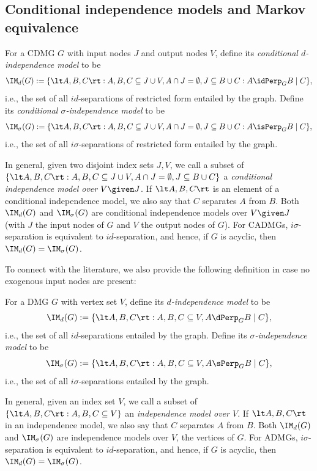 \subsection{Conditional independence models and Markov equivalence}

\begin{Def}\label{def:independence_model}
  For a CDMG $G$ with input nodes $J$ and output nodes $V$, define its \emph{conditional $d$-independence model} to be
  $$\IM_d(G) := \{ \lt A, B, C \rt : A, B, C \subseteq J \cup V, A \cap J = \emptyset, J \subseteq B \cup C : A \idPerp_G B \mid C \},$$
  i.e., the set of all $id$-separations of restricted form entailed by the graph. Define its
  \emph{conditional $\sigma$-independence model} to be
  $$\IM_\sigma(G) := \{ \lt A, B, C \rt : A, B, C \subseteq J \cup V, A \cap J = \emptyset, J \subseteq B \cup C : A \isPerp_G B \mid C \},$$
  i.e., the set of all $i\sigma$-separations of restricted form entailed by the graph. 
\end{Def}
In general, given two disjoint index sets $J,V$, we call a subset of 
$\{ \lt A, B, C \rt : A, B, C \subseteq J \cup V, A \cap J = \emptyset, J \subseteq B \cup C  \}$
a \emph{conditional independence model over $V \given J$}.
If $\lt A, B, C \rt$ is an element of a conditional independence model, we also say that $C$ separates $A$ from $B$.
Both $\IM_d(G)$ and $\IM_\sigma(G)$ are conditional independence models over $V \given J$ (with
$J$ the input nodes of $G$ and $V$ the output nodes of $G$).
For CADMGs, $i\sigma$-separation is equivalent to $id$-separation, and hence, if $G$ is acyclic, then
$\IM_d(G) = \IM_\sigma(G)$.

To connect with the literature, we also provide the following definition in case no exogenous input nodes are present:
\begin{Def}\label{def:independence_model}
  For a DMG $G$ with vertex set $V$, define its \emph{$d$-independence model} to be
  $$\IM_d(G) := \{ \lt A, B, C \rt : A, B, C \subseteq V, A \dPerp_G B \mid C \},$$
  i.e., the set of all $id$-separations entailed by the graph. Define its
  \emph{$\sigma$-independence model} to be
  $$\IM_\sigma(G) := \{ \lt A, B, C \rt : A, B, C \subseteq V, A \sPerp_G B \mid C \},$$
  i.e., the set of all $i\sigma$-separations entailed by the graph. 
\end{Def}
In general, given an index set $V$, we call a subset of 
$\{ \lt A, B, C \rt : A, B, C \subseteq V \}$
an \emph{independence model over $V$}.
If $\lt A, B, C \rt$ in an independence model, we also say that $C$ separates $A$ from $B$.
Both $\IM_d(G)$ and $\IM_\sigma(G)$ are independence models over $V$, the vertices of $G$.
For ADMGs, $i\sigma$-separation is equivalent to $id$-separation, and hence, if $G$ is acyclic, then
$\IM_d(G) = \IM_\sigma(G)$.

